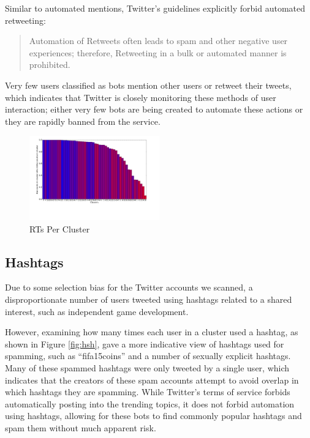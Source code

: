 \documentclass{sig-alternate-05-2015}
\begin{document}
Similar to automated mentions, Twitter's guidelines explicitly forbid automated retweeting:

\begin{quote}Automation of Retweets often leads to spam and other negative user experiences; therefore, Retweeting in a bulk or automated manner is prohibited.\cite{twitter:automation}\end{quote}

Very few users classified as bots mention other users or retweet their tweets, which indicates that Twitter is closely monitoring these methods of user interaction; either very few bots are being created to automate these actions or they are rapidly banned from the service.

\begin{figure}[h!]
	\caption{RTs Per Cluster}
	\centering
		\includegraphics[width=0.5\textwidth]{imgs/rt3}
\end{figure}

\subsection{Hashtags}

Due to some selection bias for the Twitter accounts we scanned, a disproportionate number of users tweeted using hashtags related to a shared interest, such as independent game development.

However, examining how many times each user in a cluster used a hashtag, as shown in Figure \ref{fig:hsh}, gave a more indicative view of hashtags used for spamming, such as ``fifa15coins'' and a number of sexually explicit hashtags. Many of these spammed hashtags were only tweeted by a single user, which indicates that the creators of these spam accounts attempt to avoid overlap in which hashtags they are spamming. While Twitter's terms of service forbids automatically posting into the trending topics, it does not forbid automation using hashtags, allowing for these bots to find commonly popular hashtags and spam them without much apparent risk.
\end{document}
